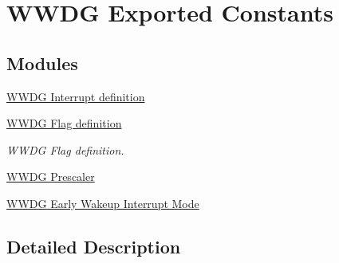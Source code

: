 \hypertarget{group___w_w_d_g___exported___constants}{}\section{W\+W\+DG Exported Constants}
\label{group___w_w_d_g___exported___constants}
\subsection*{Modules}
\begin{DoxyCompactItemize}
\item 
\hyperlink{group___w_w_d_g___interrupt__definition}{W\+W\+D\+G Interrupt definition}
\item 
\hyperlink{group___w_w_d_g___flag__definition}{W\+W\+D\+G Flag definition}
\begin{DoxyCompactList}\small\item\em W\+W\+DG Flag definition. \end{DoxyCompactList}\item 
\hyperlink{group___w_w_d_g___prescaler}{W\+W\+D\+G Prescaler}
\item 
\hyperlink{group___w_w_d_g___e_w_i___mode}{W\+W\+D\+G Early Wakeup Interrupt Mode}
\end{DoxyCompactItemize}


\subsection{Detailed Description}
